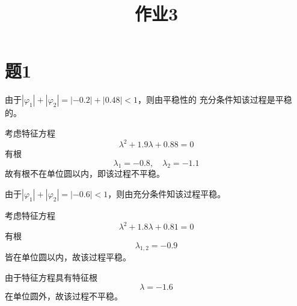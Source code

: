 \documentclass[cn]{homework}
\title{作业3}
\begin{document}
    \maketitle

    \section{题1}
    \begin{subproblem}[(\alph*)]
        \item
        由于$|\varphi_1|+|\varphi_2|=|-0.2|+|0.48|<1$，则由平稳性的
        充分条件知该过程是平稳的。

        \item
        考虑特征方程
        \[\lambda^2+1.9\lambda+0.88=0\]
        有根
        \[\lambda_1=-0.8,\quad\lambda_2=-1.1\]
        故有根不在单位圆以内，即该过程不平稳。

        \item
        由于$|\varphi_1|+|\varphi_2|=|-0.6|<1$，则由充分条件知该过程平稳。

        \item
        考虑特征方程
        \[\lambda^2+1.8\lambda+0.81=0\]
        有根
        \[\lambda_{1,2}=-0.9\]
        皆在单位圆以内，故该过程平稳。

        \item
        由于特征方程具有特征根
        \[\lambda=-1.6\]
        在单位圆外，故该过程不平稳。
    \end{subproblem}
\end{document}
